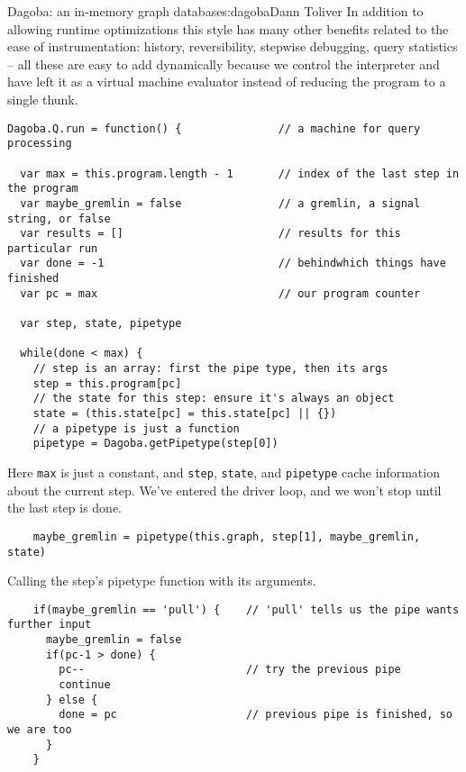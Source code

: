 \begin{aosachapter}{Dagoba: an in-memory graph database}{s:dagoba}{Dann Toliver}
In addition to allowing runtime optimizations this style has many other
benefits related to the ease of instrumentation: history, reversibility,
stepwise debugging, query statistics -- all these are easy to add
dynamically because we control the interpreter and have left it as a
virtual machine evaluator instead of reducing the program to a single
thunk.

\label{interpreter-unveiled}

\begin{verbatim}
Dagoba.Q.run = function() {               // a machine for query processing

  var max = this.program.length - 1       // index of the last step in the program
  var maybe_gremlin = false               // a gremlin, a signal string, or false
  var results = []                        // results for this particular run
  var done = -1                           // behindwhich things have finished
  var pc = max                            // our program counter

  var step, state, pipetype

  while(done < max) {
    // step is an array: first the pipe type, then its args
    step = this.program[pc]                             
    // the state for this step: ensure it's always an object
    state = (this.state[pc] = this.state[pc] || {})     
    // a pipetype is just a function
    pipetype = Dagoba.getPipetype(step[0])              
\end{verbatim}

Here \texttt{max} is just a constant, and \texttt{step}, \texttt{state},
and \texttt{pipetype} cache information about the current step. We've
entered the driver loop, and we won't stop until the last step is done.

\begin{verbatim}
    maybe_gremlin = pipetype(this.graph, step[1], maybe_gremlin, state)
\end{verbatim}

Calling the step's pipetype function with its arguments.

\begin{verbatim}
    if(maybe_gremlin == 'pull') {    // 'pull' tells us the pipe wants further input
      maybe_gremlin = false
      if(pc-1 > done) {
        pc--                         // try the previous pipe
        continue
      } else {
        done = pc                    // previous pipe is finished, so we are too
      }
    }
\end{verbatim}


\end{aosachapter}
